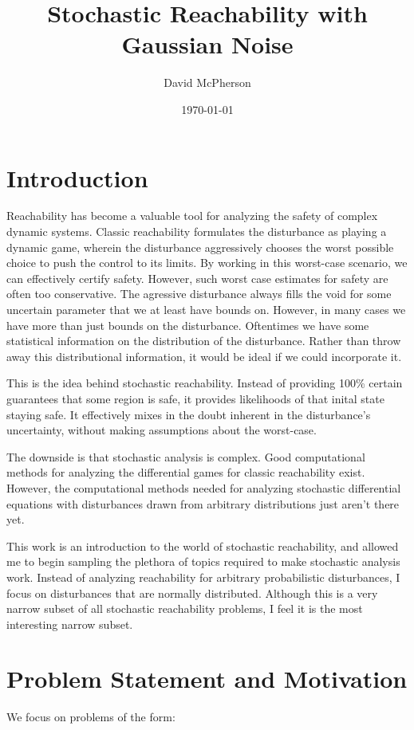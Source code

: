 \documentclass[a4paper]{article}
\title{Stochastic Reachability with Gaussian Noise}
\author{David McPherson}
\date{\today}
\begin{document}
\maketitle

\section{Introduction}
Reachability has become a valuable tool for analyzing the safety of complex dynamic systems.
Classic reachability formulates the disturbance as playing a dynamic game, wherein the disturbance aggressively chooses the worst possible choice to push the control to its limits.
By working in this worst-case scenario, we can effectively certify safety.
However, such worst case estimates for safety are often too conservative.
The agressive disturbance always fills the void for some uncertain parameter that we at least have bounds on.
However, in many cases we have more than just bounds on the disturbance.
Oftentimes we have some statistical information on the distribution of the disturbance.
Rather than throw away this distributional information, it would be ideal if we could incorporate it.

This is the idea behind stochastic reachability.
Instead of providing 100\% certain guarantees that some region is safe, it provides likelihoods of that inital state staying safe.
It effectively mixes in the doubt inherent in the disturbance's uncertainty, without making assumptions about the worst-case.

The downside is that stochastic analysis is complex.
Good computational methods for analyzing the differential games for classic reachability exist.
However, the computational methods needed for analyzing stochastic differential equations with disturbances drawn from arbitrary distributions just aren't there yet.

This work is an introduction to the world of stochastic reachability, and allowed me to begin sampling the plethora of topics required to make stochastic analysis work.
Instead of analyzing reachability for arbitrary probabilistic disturbances, I focus on disturbances that are normally distributed.
Although this is a very narrow subset of all stochastic reachability problems, I feel it is the most interesting narrow subset.

\section{Problem Statement and Motivation}
We focus on problems of the form:
\end{document}
